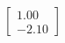 \documentclass[preview]{standalone}
\begin{document}
\begin{align*}
\begin{bmatrix} 1.00 \\ -2.10 \end{bmatrix}
\end{align*}
\end{document}
